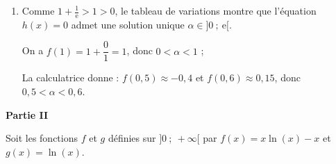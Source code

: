\begin{enumerate}
D'où le tableau de variations de $h$ :

\begin{center}
{\renewcommand{\arraystretch}{1.3}
\def\esp{\hspace*{2.5cm}}
\def\hauteur{0pt}
$\begin{array}{|c|l*4{c}|}
\hline
x & 0  & \esp & \e\, & \esp & +\infty \\ 
\hline
h'(x) & \vline\;\vline &   \pmb{+} & \vline\hspace{-2.7pt}0 & \pmb{-} & \\ 
\hline
 &  \vline\;\vline & &   \Rnode{max}{1+\frac{1}{\e}}  &  &   \\  
h &\vline\;\vline &     &  &  &  \rule{0pt}{\hauteur} \\ 
 &\vline\;\vline \Rnode{min1}{~-\infty} &   &  &  &   \Rnode{min2}{1} \rule{0pt}{\hauteur}    
 \ncline{->}{min1}{max} 
 \ncline{->}{max}{min2} 
 \\ 
\hline
\end{array} $
}
\end{center}	

\item 
Comme $1 + \frac{1}{\text{e}} > 1 > 0$, le tableau de variations montre que l'équation $h(x) = 0$ admet une solution unique $\alpha \in ]0~;~\text{e}[$.

On a $f(1) = 1 + \dfrac{0}{1} = 1$, donc $0 < \alpha < 1$ ;

La calculatrice donne :
$f(0,5) \approx - 0,4$ et $f(0,6) \approx 0,15$, donc $0,5 < \alpha < 0,6$.

\end{enumerate}

\bigskip

\textbf{Partie II}

\medskip

Soit les fonctions $f$ et $g$ définies sur $]0~;~ +\infty[$ par
$f(x) = x \ln (x) - x$ et $g(x) = \ln (x).$














